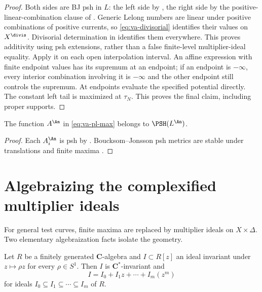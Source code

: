 \begin{proof}
Both sides are BJ psh in $L$: the left side by
, the right side by the
positive-linear-combination clause of .
Generic Lelong numbers are linear under positive combinations of
positive currents, so \eqref{eq:va-divisorial} identifies their
values on $X^{\divis}$. Divisorial determination in
 identifies them everywhere.
This proves additivity using psh extensions, rather than a false
finite-level multiplier-ideal equality.
Apply it on each open interpolation interval. An affine expression
with finite endpoint values has its supremum at an endpoint; if an
endpoint is $-\infty$, every interior combination involving it is
$-\infty$ and the other endpoint still controls the supremum.
At endpoints evaluate the specified potential directly. The constant
left tail is maximized at $\tau_N$. This proves the final claim,
including proper supports.
\end{proof}

\begin{corollary}\label{cor:va-pl-bj-psh}
The function $A^{\An}$ in \eqref{eq:va-pl-max} belongs to
$\PSH(L^{\An})$.
\end{corollary}

\begin{proof}
Each $A_i^{\An}$ is psh by
.
Boucksom--Jonsson psh metrics are stable under translations and finite
maxima \cite[Theorem~4.7]{BJ22}.
\end{proof}

\section{Algebraizing the complexified multiplier ideals}
\label{sec:va-algebraization}

For general test curves, finite maxima are replaced by multiplier ideals on
$X\times\Delta$.
Two elementary algebraization facts isolate the geometry.

\begin{lemma}\label{lem:va-circle-ideal}
Let $R$ be a finitely generated $\mathbf C$-algebra and
$I\subset R[z]$ an ideal invariant under $z\mapsto\rho z$ for every
$\rho\in S^1$.
Then $I$ is $\mathbf C^*$-invariant and
\[
             I=I_0+I_1z+\cdots+I_m(z^m)
\tag{56.16}\label{eq:va-ideal-expansion}
\]
for ideals $I_0\subseteq I_1\subseteq\cdots\subseteq I_m$ of $R$.
\end{lemma}

